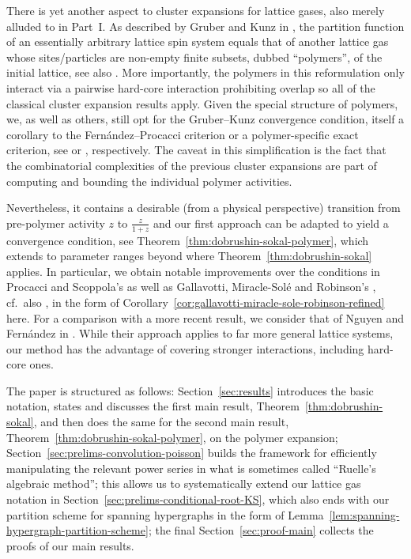 \documentclass[reqno, 11pt]{amsart}
\theoremstyle{definition}
\begin{document}
There is yet another aspect to cluster expansions for lattice gases, also merely alluded to in Part~I. 
As described by Gruber and Kunz in \cite{ref:gruber-kunz}, the partition function of an essentially arbitrary lattice spin system equals that of another lattice gas whose sites/particles are non-empty finite subsets, dubbed ``polymers'', of the initial lattice, see also \cite{ref:procacci-scoppola, ref:nguyen-fernandez}. 
More importantly, the polymers in this reformulation only interact via a pairwise hard-core interaction prohibiting overlap so all of the classical cluster expansion results apply. 
Given the special structure of polymers, we, as well as others, still opt for the Gruber--Kunz convergence condition, itself a corollary to the Fern{\'a}ndez--Procacci criterion or a polymer-specific exact criterion, see \cite{ref:fernandez-procacci, ref:bissacot-fernandez-procacci} or \cite{ref:jansen-kolesnikov}, respectively. 
The caveat in this simplification is the fact that the combinatorial complexities of the previous cluster expansions are part of computing and bounding the individual polymer activities. 

Nevertheless, it contains a desirable (from a physical perspective) transition from pre-polymer activity $z$ to $\frac{z}{1+z}$ and our first approach can be adapted to yield a convergence condition, see Theorem~\ref{thm:dobrushin-sokal-polymer}, which extends to parameter ranges beyond where Theorem~\ref{thm:dobrushin-sokal} applies. 
In particular, we obtain notable improvements over the conditions in Procacci and Scoppola's \cite{ref:procacci-scoppola} as well as Gallavotti, Miracle-Sol{\'e} and Robinson's \cite{ref:gallavotti-miracle-sole-robinson}, cf.\ also \cite{ref:ruelle}, in the form of Corollary~\ref{cor:gallavotti-miracle-sole-robinson-refined} here. 
For a comparison with a more recent result, we consider that of Nguyen and Fern{\'a}ndez in \cite{ref:nguyen-fernandez}. 
While their approach applies to far more general lattice systems, our method has the advantage of covering stronger interactions, including hard-core ones.

The paper is structured as follows: 
Section~\ref{sec:results} introduces the basic notation, states and discusses the first main result, Theorem~\ref{thm:dobrushin-sokal}, and then does the same for the second main result, Theorem~\ref{thm:dobrushin-sokal-polymer}, on the polymer expansion; 
Section~\ref{sec:prelims-convolution-poisson} builds the framework for efficiently manipulating the relevant power series in what is sometimes called ``Ruelle's algebraic method''; 
this allows us to systematically extend our lattice gas notation in Section~\ref{sec:prelims-conditional-root-KS}, which also ends with our partition scheme for spanning hypergraphs in the form of Lemma~\ref{lem:spanning-hypergraph-partition-scheme}; 
the final Section~\ref{sec:proof-main} collects the proofs of our main results.
\end{document}
